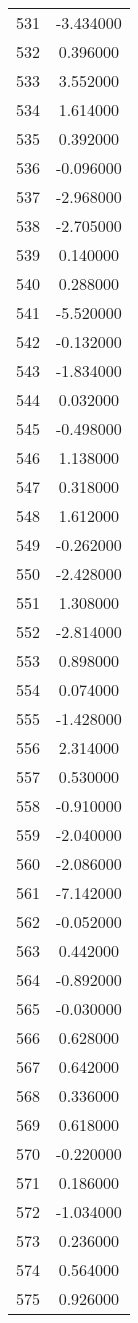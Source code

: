 \documentclass[12pt]{article}
\begin{document}
\begin{longtable}{@{}cc@{}}
531 & -3.434000 \\
532 & 0.396000 \\
533 & 3.552000 \\
534 & 1.614000 \\
535 & 0.392000 \\
536 & -0.096000 \\
537 & -2.968000 \\
538 & -2.705000 \\
539 & 0.140000 \\
540 & 0.288000 \\
541 & -5.520000 \\
542 & -0.132000 \\
543 & -1.834000 \\
544 & 0.032000 \\
545 & -0.498000 \\
546 & 1.138000 \\
547 & 0.318000 \\
548 & 1.612000 \\
549 & -0.262000 \\
550 & -2.428000 \\
551 & 1.308000 \\
552 & -2.814000 \\
553 & 0.898000 \\
554 & 0.074000 \\
555 & -1.428000 \\
556 & 2.314000 \\
557 & 0.530000 \\
558 & -0.910000 \\
559 & -2.040000 \\
560 & -2.086000 \\
561 & -7.142000 \\
562 & -0.052000 \\
563 & 0.442000 \\
564 & -0.892000 \\
565 & -0.030000 \\
566 & 0.628000 \\
567 & 0.642000 \\
568 & 0.336000 \\
569 & 0.618000 \\
570 & -0.220000 \\
571 & 0.186000 \\
572 & -1.034000 \\
573 & 0.236000 \\
574 & 0.564000 \\
575 & 0.926000 \\

\end{longtable}
\end{document}
